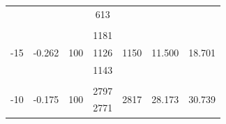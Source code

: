 \documentclass[%
 reprint,
nofootinbib,
 amsmath,amssymb,
 aps,
floatfix,
]{revtex4-2}
\begin{document}
\begin{table}[]
\begin{tabular}{@{}ccccccc@{}}
                                                            &                                                                &                                                         & 613          &                                                                      &                                                                     &   \\                                                                                \\
    \multirow{3}{*}{-15}                                    & \multirow{3}{*}{-0.262}                                        & \multirow{3}{*}{100}                                    & 1181         & \multirow{3}{*}{1150}                                                & \multirow{3}{*}{11.500}                                             & \multirow{3}{*}{18.701}                                                           \\
                                                            &                                                                &                                                         & 1126         &                                                                      &                                                                     &                                                                                   \\
                                                            &                                                                &                                                         & 1143         &                                                                      &                                                                     &  \\                                                                                 \\
    \multirow{3}{*}{-10}                                    & \multirow{3}{*}{-0.175}                                        & \multirow{3}{*}{100}                                    & 2797         & \multirow{3}{*}{2817}                                                & \multirow{3}{*}{28.173}                                             & \multirow{3}{*}{30.739}                                                           \\
                                                            &                                                                &                                                         & 2771         &                                                                      &                                                                     &                                                                                   \\

\end{tabular}
\end{table}
\end{document}
